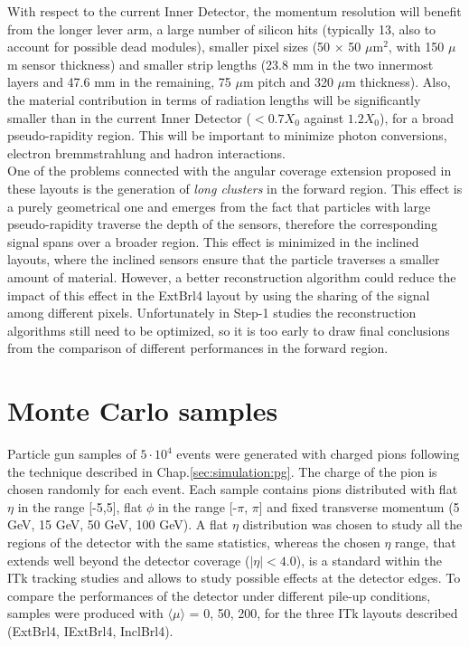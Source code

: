 \documentclass[a4paper,twoside,12pt]{book}
\begin{document}
With respect to the current Inner Detector, the momentum resolution will benefit from the longer lever arm, a large number of silicon hits (typically 13, also to account for
possible dead modules), smaller pixel sizes (50 $\times$ 50 $\mu$m$^2$, with 150 $\mu$m sensor thickness) and smaller strip lengths (23.8 mm in the two innermost
layers and 47.6 mm in the remaining, 75 $\mu$m pitch and 320 $\mu$m thickness)\cite{scoping}. Also, the material contribution in terms of radiation lengths 
will be significantly smaller than in the current Inner Detector ($< 0.7 X_{0}$ against $1.2 X_{0}$), for a broad pseudo-rapidity region. This will be important to minimize
photon conversions, electron bremmstrahlung and hadron interactions. \\

One of the problems connected with the angular coverage extension proposed in these layouts is the generation of \textit{long clusters} in the forward region. This effect is a purely 
geometrical one and emerges from the fact that particles with large pseudo-rapidity traverse the depth of the sensors, therefore the corresponding signal spans over a broader region. This effect is
minimized in the inclined layouts, where the inclined sensors ensure that the particle traverses a smaller amount of material. However, a better reconstruction algorithm could reduce
the impact of this effect in the ExtBrl4 layout by using the sharing 
of the signal among different pixels. Unfortunately in Step-1 studies the reconstruction algorithms still need to be optimized,
so it is too early to draw final conclusions from the comparison of different performances in the forward region. \\

\section{Monte Carlo samples}\label{sec:tracking:sampleProduction}
Particle gun samples of $5\cdot 10^4$ events were generated with charged pions following the technique described in Chap.\ref{sec:simulation:pg}. The charge of the pion
is chosen randomly for each event. 
Each sample contains pions distributed with flat $\eta$ in the range [-5,5], flat $\phi$ in the range [-$\pi$, $\pi$] and fixed transverse momentum (5 GeV, 15 GeV, 50 GeV, 100 GeV). 
A flat $\eta$ distribution was chosen to study all the regions of the detector with the same statistics, whereas the chosen $\eta$ range, that extends well beyond the detector coverage ($|\eta| < 4.0$),
is a standard within the ITk tracking studies and allows to study possible effects at the detector edges. 
To compare the performances of the detector under different pile-up conditions, samples were produced with $\langle\mu\rangle$ = 0, 50, 200, for the three ITk layouts described (ExtBrl4,
IExtBrl4, InclBrl4).
\end{document}
